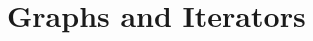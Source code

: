 \chapter{Graphs and Iterators} 
\label{Graph Iterators and Data Accessors}
\label{Graph Iterators}\label{Graph Iterators and Data Accessors}


